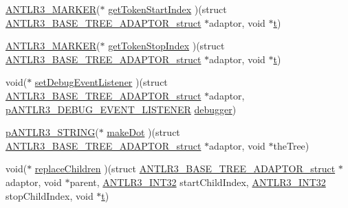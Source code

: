 \begin{DoxyCompactItemize}
\item 
\hyperlink{antlr3defs_8h_a0361e6bf442e07afe923e4d05e9ebc4f}{A\-N\-T\-L\-R3\-\_\-\-M\-A\-R\-K\-E\-R}($\ast$ \hyperlink{struct_a_n_t_l_r3___b_a_s_e___t_r_e_e___a_d_a_p_t_o_r__struct_ad60434c91a44311e15ff57e95132919e}{get\-Token\-Start\-Index} )(struct \hyperlink{struct_a_n_t_l_r3___b_a_s_e___t_r_e_e___a_d_a_p_t_o_r__struct}{A\-N\-T\-L\-R3\-\_\-\-B\-A\-S\-E\-\_\-\-T\-R\-E\-E\-\_\-\-A\-D\-A\-P\-T\-O\-R\-\_\-struct} $\ast$adaptor, void $\ast$\hyperlink{showimage_8m_ad941f6ef920fbfb3d75b60ddbedbdd39}{t})
\item 
\hyperlink{antlr3defs_8h_a0361e6bf442e07afe923e4d05e9ebc4f}{A\-N\-T\-L\-R3\-\_\-\-M\-A\-R\-K\-E\-R}($\ast$ \hyperlink{struct_a_n_t_l_r3___b_a_s_e___t_r_e_e___a_d_a_p_t_o_r__struct_a65920a9b499dda16341586e8ae1ead28}{get\-Token\-Stop\-Index} )(struct \hyperlink{struct_a_n_t_l_r3___b_a_s_e___t_r_e_e___a_d_a_p_t_o_r__struct}{A\-N\-T\-L\-R3\-\_\-\-B\-A\-S\-E\-\_\-\-T\-R\-E\-E\-\_\-\-A\-D\-A\-P\-T\-O\-R\-\_\-struct} $\ast$adaptor, void $\ast$\hyperlink{showimage_8m_ad941f6ef920fbfb3d75b60ddbedbdd39}{t})
\item 
void($\ast$ \hyperlink{struct_a_n_t_l_r3___b_a_s_e___t_r_e_e___a_d_a_p_t_o_r__struct_aca9f7b62dfe1d6f2f1d6573a566123ab}{set\-Debug\-Event\-Listener} )(struct \hyperlink{struct_a_n_t_l_r3___b_a_s_e___t_r_e_e___a_d_a_p_t_o_r__struct}{A\-N\-T\-L\-R3\-\_\-\-B\-A\-S\-E\-\_\-\-T\-R\-E\-E\-\_\-\-A\-D\-A\-P\-T\-O\-R\-\_\-struct} $\ast$adaptor, \hyperlink{antlr3interfaces_8h_ab226a624395fcc0b8fe2b29ae60b6116}{p\-A\-N\-T\-L\-R3\-\_\-\-D\-E\-B\-U\-G\-\_\-\-E\-V\-E\-N\-T\-\_\-\-L\-I\-S\-T\-E\-N\-E\-R} \hyperlink{struct_a_n_t_l_r3___b_a_s_e___t_r_e_e___a_d_a_p_t_o_r__struct_af2d558faa308c0d544780b9a666b0728}{debugger})
\item 
\hyperlink{antlr3interfaces_8h_a36bbe7362079348864db4b4dbdcce56b}{p\-A\-N\-T\-L\-R3\-\_\-\-S\-T\-R\-I\-N\-G}($\ast$ \hyperlink{struct_a_n_t_l_r3___b_a_s_e___t_r_e_e___a_d_a_p_t_o_r__struct_ac29cbeee7e9972260161290db9baed12}{make\-Dot} )(struct \hyperlink{struct_a_n_t_l_r3___b_a_s_e___t_r_e_e___a_d_a_p_t_o_r__struct}{A\-N\-T\-L\-R3\-\_\-\-B\-A\-S\-E\-\_\-\-T\-R\-E\-E\-\_\-\-A\-D\-A\-P\-T\-O\-R\-\_\-struct} $\ast$adaptor, void $\ast$the\-Tree)
\item 
void($\ast$ \hyperlink{struct_a_n_t_l_r3___b_a_s_e___t_r_e_e___a_d_a_p_t_o_r__struct_a8dd0de04b25ba14306f168394332d10f}{replace\-Children} )(struct \hyperlink{struct_a_n_t_l_r3___b_a_s_e___t_r_e_e___a_d_a_p_t_o_r__struct}{A\-N\-T\-L\-R3\-\_\-\-B\-A\-S\-E\-\_\-\-T\-R\-E\-E\-\_\-\-A\-D\-A\-P\-T\-O\-R\-\_\-struct} $\ast$adaptor, void $\ast$parent, \hyperlink{antlr3defs_8h_a6faef5c4687f8eb633d2aefea93973ca}{A\-N\-T\-L\-R3\-\_\-\-I\-N\-T32} start\-Child\-Index, \hyperlink{antlr3defs_8h_a6faef5c4687f8eb633d2aefea93973ca}{A\-N\-T\-L\-R3\-\_\-\-I\-N\-T32} stop\-Child\-Index, void $\ast$\hyperlink{showimage_8m_ad941f6ef920fbfb3d75b60ddbedbdd39}{t})

\end{DoxyCompactItemize}
